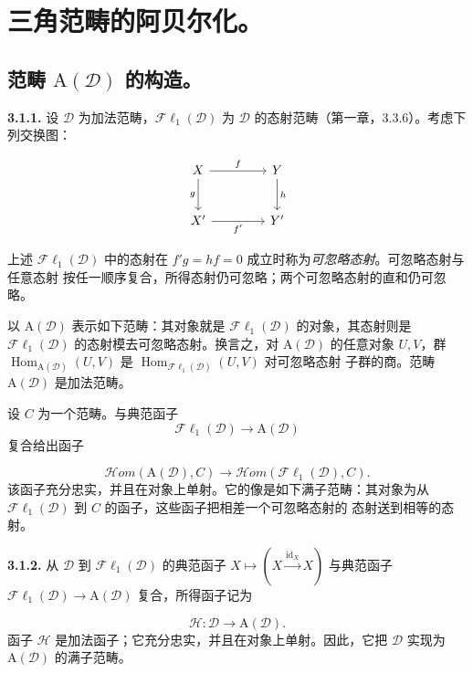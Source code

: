 \clearpage
{}%
\begingroup
\small
\setlength{\parskip}{0pt}%
\setlength{\emergencystretch}{1.5em}%

\section{三角范畴的阿贝尔化。}

\subsection{范畴 \texorpdfstring{$\mathrm A(\mathcal D)$}{A(D)} 的构造。}

\noindent\textbf{3.1.1.}\quad
设 $\mathcal D$ 为加法范畴，$\mathcal{F}\ell_1(\mathcal D)$ 为
$\mathcal D$ 的态射范畴（第一章，3.3.6）。考虑下列交换图：

\[
\begin{tikzcd}[column sep=4.2em,row sep=2.5em]
X \arrow[r,"f"] \arrow[d,"g"'] & Y \arrow[d,"h"] \\
X' \arrow[r,"f'"'] & Y'
\end{tikzcd}
\]

\noindent 上述 $\mathcal{F}\ell_1(\mathcal D)$ 中的态射在
$f'g=hf=0$ 成立时称为\emph{可忽略态射}。可忽略态射与任意态射
按任一顺序复合，所得态射仍可忽略；两个可忽略态射的直和仍可忽略。

以 $\mathrm A(\mathcal D)$ 表示如下范畴：其对象就是
$\mathcal{F}\ell_1(\mathcal D)$ 的对象，其态射则是
$\mathcal{F}\ell_1(\mathcal D)$ 的态射模去可忽略态射。换言之，对
$\mathrm A(\mathcal D)$ 的任意对象 $U,V$，群
$\operatorname{Hom}_{\mathrm A(\mathcal D)}(U,V)$ 是
$\operatorname{Hom}_{\mathcal{F}\ell_1(\mathcal D)}(U,V)$ 对可忽略态射
子群的商。范畴 $\mathrm A(\mathcal D)$ 是加法范畴。

设 $C$ 为一个范畴。与典范函子
\[
\mathcal{F}\ell_1(\mathcal D)\longrightarrow\mathrm A(\mathcal D)
\]
复合给出函子

\[
\mathcal H\!om(\mathrm A(\mathcal D),C)
\longrightarrow
\mathcal H\!om(\mathcal{F}\ell_1(\mathcal D),C).
\tag{3.1.1.1}
\]
该函子充分忠实，并且在对象上单射。它的像是如下满子范畴：其对象为从
$\mathcal{F}\ell_1(\mathcal D)$ 到 $C$ 的函子，这些函子把相差一个可忽略态射的
态射送到相等的态射。

\medskip
\noindent\textbf{3.1.2.}\quad
从 $\mathcal D$ 到 $\mathcal{F}\ell_1(\mathcal D)$ 的典范函子
$X\longmapsto(X\xrightarrow{\operatorname{id}_X}X)$ 与典范函子
$\mathcal{F}\ell_1(\mathcal D)\longrightarrow\mathrm A(\mathcal D)$ 复合，所得函子记为

\[
\mathcal H\colon\mathcal D\longrightarrow\mathrm A(\mathcal D).
\tag{3.1.2.1}
\]
函子 $\mathcal H$ 是加法函子；它充分忠实，并且在对象上单射。因此，它把
$\mathcal D$ 实现为 $\mathrm A(\mathcal D)$ 的满子范畴。
\endgroup
